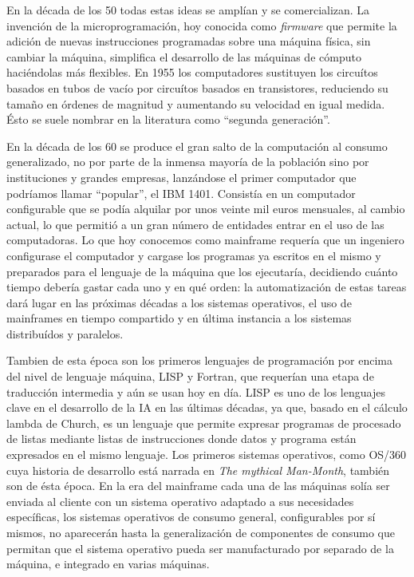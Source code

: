 \documentclass[12pt]{memoir}
\begin{document}
En la década de los 50 todas estas ideas se amplían y se comercializan. La invención de la microprogramación, hoy conocida como \textit{firmware} que permite la adición de nuevas instrucciones programadas sobre una máquina física, sin cambiar la máquina, simplifica el desarrollo de las máquinas de cómputo haciéndolas más flexibles. En 1955 los computadores sustituyen los circuítos basados en tubos de vacío por circuítos basados en transistores, reduciendo su tamaño en órdenes de magnitud y aumentando su velocidad en igual medida. Ésto se suele nombrar en la literatura como ``segunda generación''.

En la década de los 60 se produce el gran salto de la computación al consumo generalizado, no por parte de la inmensa mayoría de la población sino por instituciones y grandes empresas, lanzándose el primer computador que podríamos llamar ``popular'', el IBM 1401. Consistía en un computador configurable que se podía alquilar por unos veinte mil euros mensuales, al cambio actual, lo que permitió a un gran número de entidades entrar en el uso de las computadoras. Lo que hoy conocemos como mainframe requería que un ingeniero configurase el computador y cargase los programas ya escritos en el mismo y preparados para el lenguaje de la máquina que los ejecutaría, decidiendo cuánto tiempo debería gastar cada uno y en qué orden: la automatización de estas tareas dará lugar en las próximas décadas a los sistemas operativos, el uso de mainframes en tiempo compartido y en última instancia a los sistemas distribuídos y paralelos. 

Tambien de esta época son los primeros lenguajes de programación por encima del nivel de lenguaje máquina, LISP y Fortran, que requerían una etapa de traducción intermedia y aún se usan hoy en día. LISP es uno de los lenguajes clave en el desarrollo de la IA en las últimas décadas, ya que, basado en el cálculo lambda de Church, es un lenguaje que permite expresar programas de procesado de listas mediante listas de instrucciones donde datos y programa están expresados en el mismo lenguaje. Los primeros sistemas operativos, como OS/360 cuya historia de desarrollo está narrada en \textit{The mythical Man-Month}, también son de ésta época. En la era del mainframe cada una de las máquinas solía ser enviada al cliente con un sistema operativo adaptado a sus necesidades específicas, los sistemas operativos de consumo general, configurables por sí mismos, no aparecerán hasta la generalización de componentes de consumo que permitan que el sistema operativo pueda ser manufacturado por separado de la máquina, e integrado en varias máquinas.
\end{document}
